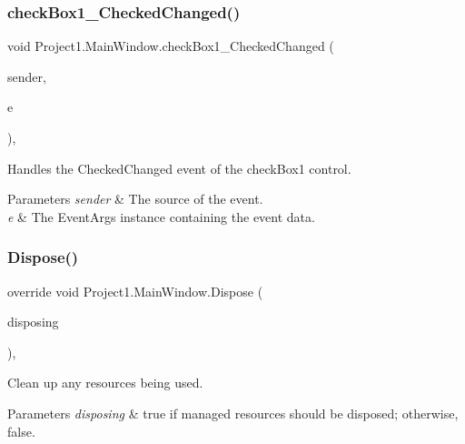\subsubsection{\texorpdfstring{check\+Box1\+\_\+\+Checked\+Changed()}{checkBox1\_CheckedChanged()}}
{\footnotesize\ttfamily void Project1.\+Main\+Window.\+check\+Box1\+\_\+\+Checked\+Changed (\begin{DoxyParamCaption}\item[{object}]{sender,  }\item[{Event\+Args}]{e }\end{DoxyParamCaption})\hspace{0.3cm}{\ttfamily [inline]}, {\ttfamily [private]}}



Handles the Checked\+Changed event of the check\+Box1 control. 


\begin{DoxyParams}{Parameters}
{\em sender} & The source of the event.\\
\hline
{\em e} & The Event\+Args instance containing the event data.\\
\hline
\end{DoxyParams}
\mbox{\label{classProject1_1_1MainWindow_a6a752bcb31d44385e4f21b1e75861615}} 
\subsubsection{\texorpdfstring{Dispose()}{Dispose()}}
{\footnotesize\ttfamily override void Project1.\+Main\+Window.\+Dispose (\begin{DoxyParamCaption}\item[{bool}]{disposing }\end{DoxyParamCaption})\hspace{0.3cm}{\ttfamily [inline]}, {\ttfamily [protected]}}



Clean up any resources being used. 


\begin{DoxyParams}{Parameters}
{\em disposing} & true if managed resources should be disposed; otherwise, false.\\
\hline
\end{DoxyParams}
\mbox{\label{classProject1_1_1MainWindow_a3062c1009a2a7a443176cf874520eebe}} 
